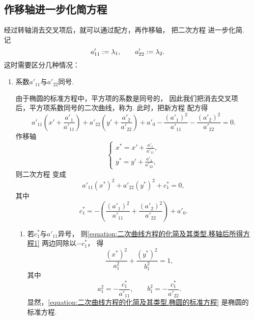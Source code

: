 \subsection{作移轴进一步化简方程}
经过转轴消去交叉项后，就可以通过配方，再作移轴，
把二次方程  进一步化简.
记\begin{equation*}
	a'_{11} := \lambda_1,
	\qquad
	a'_{22} := \lambda_2.
\end{equation*}
这时需要区分几种情况：
\begin{enumerate}
	\item 系数\(a'_{11}\)与\(a'_{22}\)同号.

	由于椭圆的标准方程中，平方项的系数是同号的，
	因此我们把消去交叉项后，平方项系数同号的二次曲线，称为.
	此时，把新方程  配方得\begin{equation*}
		a'_{11} \left( x' + \frac{a'_1}{a'_{11}} \right)
		+ a'_{22} \left( y' + \frac{a'_2}{a'_{22}} \right)
		+ a'_0
		- \frac{(a'_1)^2}{a'_{11}}
		- \frac{(a'_2)^2}{a'_{22}}
		= 0.
	\end{equation*}
	作移轴\begin{equation}\label{equation:二次曲线方程的化简及其类型.移轴变换}
		\left\{ \begin{array}{l}
			x^* = x' + \frac{a'_1}{a'_{11}}, \\
			y^* = y' + \frac{a'_2}{a'_{22}},
		\end{array} \right.
	\end{equation}
	则二次方程 
	变成\begin{equation}\label{equation:二次曲线方程的化简及其类型.移轴后所得方程1}
		a'_{11} (x^*)^2 + a'_{22} (y^*)^2 + c^*_1 = 0,
	\end{equation}
	其中\begin{equation*}
		c^*_1 = - \left( \frac{(a'_1)^2}{a'_{11}} + \frac{(a'_2)^2}{a'_{22}} \right) + a'_0.
	\end{equation*}
	\begin{enumerate}
		\item 若\(c^*_1\)与\(a'_{11}\)异号，
		则\cref{equation:二次曲线方程的化简及其类型.移轴后所得方程1} 两边同除以\(-c^*_1\)，
		得\begin{equation}\label{equation:二次曲线方程的化简及其类型.椭圆的标准方程}
			\frac{(x^*)^2}{a_1^2} + \frac{(y^*)^2}{b_1^2} = 1,
		\end{equation}
		其中\begin{equation*}
			a_1^2 = -\frac{c_1^*}{a'_{11}},
			\qquad
			b_1^2 = -\frac{c_1^*}{a'_{22}}.
		\end{equation*}
		显然，\cref{equation:二次曲线方程的化简及其类型.椭圆的标准方程} 是椭圆的标准方程.


\end{enumerate}
\end{enumerate}
